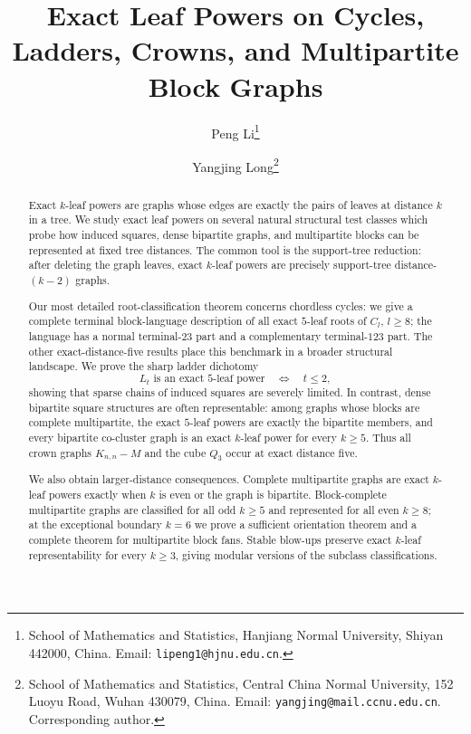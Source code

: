 \documentclass[11pt]{article}
\theoremstyle{definition}
\begin{document}
\title{Exact Leaf Powers on Cycles, Ladders, Crowns, and Multipartite Block Graphs}
\author{Peng Li\thanks{School of Mathematics and Statistics, Hanjiang Normal University, Shiyan 442000, China. Email: \texttt{lipeng1@hjnu.edu.cn}.}
\and Yangjing Long\thanks{School of Mathematics and Statistics, Central China Normal University, 152 Luoyu Road, Wuhan 430079, China. Email: \texttt{yangjing@mail.ccnu.edu.cn}. Corresponding author.}}
\date{}
\maketitle

\begin{abstract}
Exact $k$-leaf powers are graphs whose edges are exactly the pairs of leaves at distance $k$ in a tree.  We study exact leaf powers on several natural structural test classes which probe how induced squares, dense bipartite graphs, and multipartite blocks can be represented at fixed tree distances.  The common tool is the support-tree reduction: after deleting the graph leaves, exact $k$-leaf powers are precisely support-tree distance-$(k-2)$ graphs.

Our most detailed root-classification theorem concerns chordless cycles: we give a complete terminal block-language description of all exact $5$-leaf roots of $C_l$, $l\ge8$; the language has a normal terminal-$23$ part and a complementary terminal-$123$ part.  The other exact-distance-five results place this benchmark in a broader structural landscape.  We prove the sharp ladder dichotomy
\[
 L_t\text{ is an exact }5\text{-leaf power}\quad\Longleftrightarrow\quad t\le2,
\]
showing that sparse chains of induced squares are severely limited.  In contrast, dense bipartite square structures are often representable: among graphs whose blocks are complete multipartite, the exact $5$-leaf powers are exactly the bipartite members, and every bipartite co-cluster graph is an exact $k$-leaf power for every $k\ge5$.  Thus all crown graphs $K_{n,n}-M$ and the cube $Q_3$ occur at exact distance five.

We also obtain larger-distance consequences.  Complete multipartite graphs are exact $k$-leaf powers exactly when $k$ is even or the graph is bipartite.  Block-complete multipartite graphs are classified for all odd $k\ge5$ and represented for all even $k\ge8$; at the exceptional boundary $k=6$ we prove a sufficient orientation theorem and a complete theorem for multipartite block fans.  Stable blow-ups preserve exact $k$-leaf representability for every $k\ge3$, giving modular versions of the subclass classifications.
\end{abstract}
\end{document}

